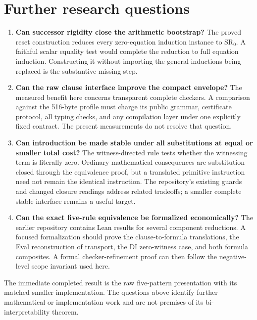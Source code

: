 \section{Further research questions}

\begin{enumerate}
\item \textbf{Can successor rigidity close the arithmetic bootstrap?}
The proved reset construction reduces every zero-equation induction
instance to SR$_0$. A faithful scalar equality test would complete the
reduction to full equation induction. Constructing it without importing
the general inductions being replaced is the substantive missing step.

\item \textbf{Can the raw clause interface improve the compact envelope?}
The measured benefit here concerns transparent complete checkers. A
comparison against the 516-byte profile must charge its public grammar,
certificate protocol, all typing checks, and any compilation layer under
one explicitly fixed contract. The present measurements do not resolve
that question.

\item \textbf{Can introduction be made stable under all substitutions
at equal or smaller total cost?}
The witness-directed rule tests whether the witnessing term is literally
zero. Ordinary mathematical consequences are substitution closed through
the equivalence proof, but a translated primitive instruction need not
remain the identical instruction. The repository's existing guards and
changed closure readings address related tradeoffs; a smaller complete
stable interface remains a useful target.

\item \textbf{Can the exact five-rule equivalence be formalized economically?}
The earlier repository contains Lean results for several component
reductions. A focused formalization should prove the clause-to-formula
translations, the Eval reconstruction of transport, the DI zero-witness
case, and both formula composites. A formal checker-refinement proof can
then follow the negative-level scope invariant used here.
\end{enumerate}

The immediate completed result is the raw five-pattern presentation with
its matched smaller implementation. The questions above identify further
mathematical or implementation work and are not premises of its
bi-interpretability theorem.
